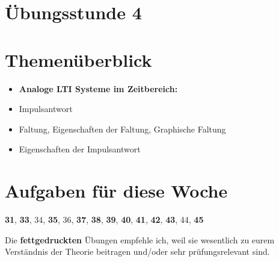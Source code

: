 \documentclass[11pt]{article}
\begin{document}
\thispagestyle{firstpage}

\setlength{\headheight}{1 \baselineskip}  %
\setlength{\parindent}{0pt}  %
\setlength{\parskip}{\baselineskip}  %

\vspace*{-5px}
\section*{Übungsstunde 4}

\section*{Themenüberblick}
\begin{itemize}
    \item \textbf{Analoge LTI Systeme im Zeitbereich:}
    \item[] Impulsantwort
    \item[] Faltung, Eigenschaften der Faltung, Graphische Faltung
    \item[] Eigenschaften der Impulsantwort
\end{itemize}

\section*{Aufgaben für diese Woche}
\vspace{-0.5cm}

\textbf{31}, \textbf{33}, 34, \textbf{35}, 36, \textbf{37}, \textbf{38}, \textbf{39}, \textbf{40}, \textbf{41}, \textbf{42}, \textbf{43}, 44, \textbf{45}\\
\vspace{-0.5cm}

Die \textbf{fettgedruckten} Übungen empfehle ich, weil sie wesentlich zu eurem Verständnis der Theorie beitragen und/oder sehr prüfungsrelevant sind.

\vfill \null
\pagebreak
\end{document}
